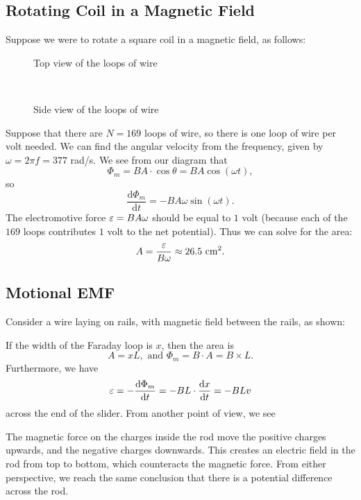 \documentclass[class=article, crop=false]{standalone}
\begin{document}
  \subsection{Rotating Coil in a Magnetic Field}
  Suppose we were to rotate a square coil in a magnetic field, as follows:
  \begin{figure}[ht]
    \centering
    \caption{Top view of the loops of wire}
  \end{figure} \\[30pt]
  \begin{figure}[ht]
    \centering
    \caption{Side view of the loops of wire}
  \end{figure}
  Suppose that there are $N = 169$ loops of wire, so there is one loop of wire per volt needed. We can find the angular velocity from the frequency, given by $\omega = 2\pi f = 377$ rad/s. We see from our diagram that
  \[
    \Phi_m = BA\cdot \cos\theta = BA\cos(\omega t),
  \]
  so
  \[
    \frac{\mathrm{d}\Phi_m}{\mathrm{d}t} = -BA\omega\sin (\omega t).
  \]
  The electromotive force $\varepsilon = BA\omega$ should be equal to $1$ volt (because each of the $169$ loops contributes $1$ volt to the net potential). Thus we can solve for the area:
  \[
    A = \frac{\varepsilon}{B\omega} \approx 26.5\text{ cm}^2.
  \]
  \newpage
  \subsection{Motional EMF}
  Consider a wire laying on rails, with magnetic field between the rails, as shown: \par
  \begin{figure}[ht]
    \centering
  \end{figure}
  If the width of the Faraday loop is $x$, then the area is
  \[
    A = xL, \text{ and }\Phi_m = B\cdot A = B\times L.
  \]
  Furthermore, we have
  \[
    \varepsilon = - \frac{\mathrm{d}\Phi_m}{\mathrm{d}t} = -BL\cdot \frac{\mathrm{d}x}{\mathrm{d}t} = -BLv
  \]
  across the end of the slider. From another point of view, we see \par
  \begin{figure}[ht]
    \centering
  \end{figure}
  The magnetic force on the charges inside the rod move the positive charges upwards, and the negative charges downwards. This creates an electric field in the rod from top to bottom, which counteracts the magnetic force. From either perspective, we reach the same conclusion that there is a potential difference across the rod.
\end{document}
